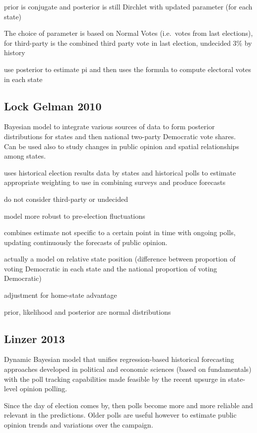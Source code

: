 \documentclass[
  12pt]{article}
\begin{document}
prior is conjugate and posterior is still Dirchlet with updated
parameter (for each state)

The choice of parameter is based on Normal Votes (i.e.~votes from last
elections), for third-party is the combined third party vote in last
election, undecided 3\% by history

use posterior to estimate pi and then uses the formula to compute
electoral votes in each state

\hypertarget{lock-gelman-2010}{%
\subsection{Lock Gelman 2010}\label{lock-gelman-2010}}

Bayesian model to integrate various sources of data to form posterior
distributions for states and then national two-party Democratic vote
shares.\\
Can be used also to study changes in public opinion and spatial
relationships among states.

uses historical election results data by states and historical polls to
estimate appropriate weighting to use in combining surveys and produce
forecasts

do not consider third-party or undecided

model more robust to pre-election fluctuations

combines estimate not specific to a certain point in time with ongoing
polls, updating continuously the forecasts of public opinion.

actually a model on relative state position (difference between
proportion of voting Democratic in each state and the national
proportion of voting Democratic)

adjustment for home-state advantage

prior, likelihood and posterior are normal distributions

\hypertarget{linzer-2013}{%
\subsection{Linzer 2013}\label{linzer-2013}}

Dynamic Bayesian model that unifies regression-based historical
forecasting approaches developed in political and economic sciences
(based on fundamentals) with the poll tracking capabilities made
feasible by the recent upsurge in state-level opinion polling.

Since the day of election comes by, then polls become more and more
reliable and relevant in the predictions. Older polls are useful however
to estimate public opinion trends and variations over the campaign.
\end{document}
